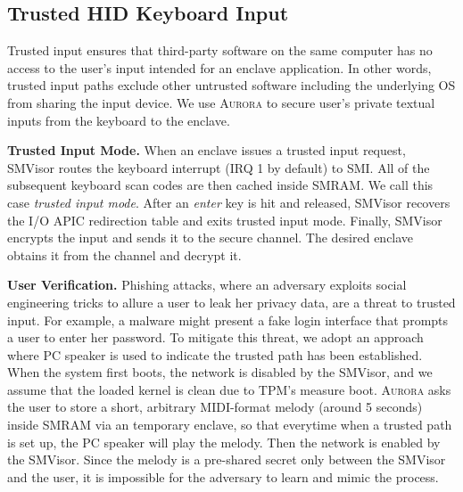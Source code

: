 \subsection{Trusted HID Keyboard Input}\label{input_service}
Trusted input ensures that third-party software on the same computer has no access to the user's input intended for an enclave application. In other words, trusted input paths exclude other untrusted software including the underlying OS from sharing the input device. We use \textsc{Aurora} to secure user's private textual inputs from the keyboard to the enclave.%

\textbf{Trusted Input Mode.}
When an enclave issues a trusted input request, SMVisor routes the keyboard interrupt (IRQ 1 by default) to SMI. All of the subsequent keyboard scan codes are then cached inside SMRAM. We call this case \emph{trusted input mode}. After an \emph{enter} key is hit and released, SMVisor recovers the I/O APIC redirection table and exits trusted input mode. Finally, SMVisor encrypts the input and sends it to the secure channel. The desired enclave obtains it from the channel and decrypt it.

\textbf{User Verification.}
Phishing attacks, where an adversary exploits social engineering tricks to allure a user to leak her privacy data, are a threat to trusted input. For example, a malware might present a fake login interface that prompts a user to enter her password.
To mitigate this threat, we adopt an approach where PC speaker is used to indicate the trusted path has been established.
When the system first boots, the network is disabled by the SMVisor, and we assume that the loaded kernel is clean due to TPM's measure boot. \textsc{Aurora} asks the user to store a short, arbitrary MIDI-format melody (around 5 seconds) inside SMRAM via an temporary enclave, so that everytime when a trusted path is set up, the PC speaker will play the melody. Then the network is enabled by the SMVisor. Since the melody is a pre-shared secret only between the SMVisor and the user, it is impossible for the adversary to learn and mimic the process.

